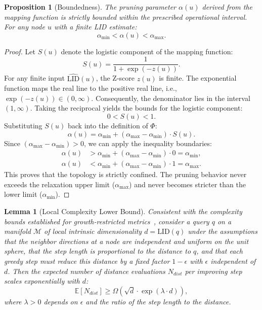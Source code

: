\documentclass{article}
\theoremstyle{plain}
\newtheorem{proposition}[theorem]{Proposition}
\newtheorem{lemma}[theorem]{Lemma}
\theoremstyle{definition}
\theoremstyle{remark}
\begin{document}
\begin{proposition}[Boundedness]\label{proof:bound}
The pruning parameter $\alpha(u)$ derived from the mapping function is strictly bounded within the prescribed operational interval. For any node $u$ with a finite LID estimate:
\begin{equation}
    \alpha_{\min} < \alpha(u) < \alpha_{\max}.
\end{equation}
\end{proposition}

\begin{proof}
Let $S(u)$ denote the logistic component of the mapping function:
\begin{equation}
    S(u) = \frac{1}{1 + \exp(-z(u))}.
\end{equation}
For any finite input $\widehat{\text{LID}}(u)$, the Z-score $z(u)$ is finite. The exponential function maps the real line to the positive real line, i.e., $\exp(-z(u)) \in (0, \infty)$.
Consequently, the denominator lies in the interval $(1, \infty)$. Taking the reciprocal yields the bounds for the logistic component:
\begin{equation}
    0 < S(u) < 1.
\end{equation}
Substituting $S(u)$ back into the definition of $\Phi$:
\begin{equation}
    \alpha(u) = \alpha_{\min} + (\alpha_{\max} - \alpha_{\min}) \cdot S(u).
\end{equation}
Since $(\alpha_{\max} - \alpha_{\min}) > 0$, we can apply the inequality boundaries:
\begin{align}
    \alpha(u) &> \alpha_{\min} + (\alpha_{\max} - \alpha_{\min}) \cdot 0 = \alpha_{\min}, \\
    \alpha(u) &< \alpha_{\min} + (\alpha_{\max} - \alpha_{\min}) \cdot 1 = \alpha_{\max}.
\end{align}
This proves that the topology is strictly confined. 
The pruning behavior never exceeds the relaxation upper limit ($\alpha_{\max}$) and never becomes stricter than the lower limit ($\alpha_{\min}$).
\end{proof}

\begin{lemma}[Local Complexity Lower Bound]
\label{proof:complexity}
Consistent with the complexity bounds established for growth-restricted metrics~\cite{karger2002finding}, consider a query $q$ on a manifold $\mathcal{M}$ of local intrinsic dimensionality $d = \text{LID}(q)$ under the assumptions that the neighbor directions at a node are independent and uniform on the unit sphere, that the step length is proportional to the distance to $q$, and that each greedy step must reduce this distance by a fixed factor $1-\epsilon$ with $\epsilon$ independent of $d$. Then the expected number of distance evaluations $N_{dist}$ per improving step scales exponentially with $d$:
\begin{equation}
    \mathbb{E}[N_{dist}] \ge \Omega\left( \sqrt{d} \cdot \exp(\lambda \cdot d) \right),
\end{equation}
where $\lambda > 0$ depends on $\epsilon$ and the ratio of the step length to the distance.
\end{lemma}
\end{document}
